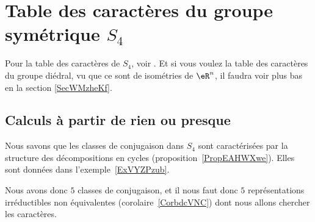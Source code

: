 \section{Table des caractères du groupe symétrique \texorpdfstring{\(  S_4\)}{S4}}
\label{SecUMIgTmO}

Pour la table des caractères de \( S_4\), voir \cite{KXjFWKA}. Et si vous voulez la table des caractères du groupe diédral, vu que ce sont de isométries de \( \eR^n\), il faudra voir plus bas en la section \ref{SecWMzheKf}.

\subsection{Calculs à partir de rien ou presque}

Nous savons que les classes de conjugaison dans \( S_4\) sont caractérisées par la structure des décompositions en cycles (proposition~\ref{PropEAHWXwe}). Elles sont données dans l'exemple~\ref{ExVYZPzub}.

Nous avons donc \( 5\) classes de conjugaison, et il nous faut donc \( 5\) représentations irréductibles non équivalentes (corolaire~\ref{CorbdcVNC}) dont nous allons chercher les caractères.

